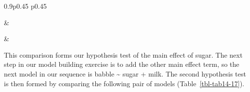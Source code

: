 \documentclass[
  a4paper,
]{book}
\begin{document}
\begin{table}[ht]
\caption{\label{tbl-tab14-16}Null and alternative hypotheses with the outcome variable ``babble'' }\tabularnewline

\begin{centerbox}
\begin{threeparttable}
\setlength{\tabcolsep}{0pt}
\begin{tabularx}{0.9\textwidth}{p{} p{}}



 &
 \tabularnewline[-0.5pt]



 &
 \tabularnewline[-0.5pt]


\end{tabularx} 

\end{threeparttable}\par\end{centerbox}

\end{table}
 

This comparison forms our hypothesis test of the main effect of sugar.
The next step in our model building exercise is to add the other main
effect term, so the next model in our sequence is babble
\textasciitilde{} sugar + milk. The second hypothesis test is then
formed by comparing the following pair of models
(Table~\ref{tbl-tab14-17}).
\end{document}
